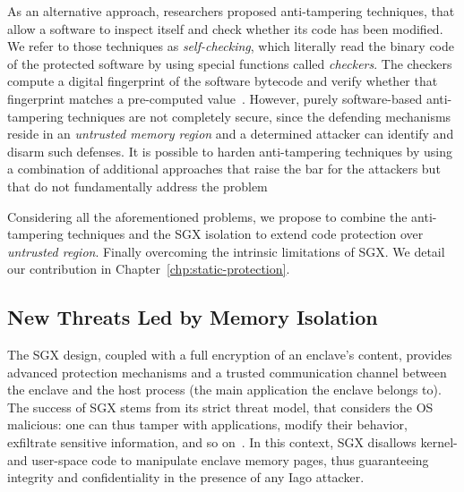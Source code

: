 As an alternative approach, researchers proposed anti-tampering techniques, 
that allow a software to inspect itself and check whether its code has been 
modified.
We refer to those techniques as \emph{self-checking}, which literally read the 
binary code of the protected software by using special functions called 
\emph{checkers}.
The checkers compute a digital fingerprint of the software bytecode and verify 
whether that fingerprint matches a pre-computed 
value~\citep{nagra2009surreptitious}. 
However, purely software-based anti-tampering techniques are not 
completely secure, since the defending mechanisms reside in an 
\emph{untrusted memory region} and a determined attacker can identify and 
disarm such defenses.
It is possible to harden anti-tampering techniques by using a combination of 
additional 
approaches that raise the bar for the attackers but that do not fundamentally 
address the 
problem~~\citep{horne2001dynamic,banescu2017tutorial,chen2016advanced,chang2001protecting,viticchie2016reactive}

Considering all the aforementioned problems, we propose to combine the 
anti-tampering techniques and the SGX isolation to extend code protection over 
\emph{untrusted region}.
Finally overcoming the intrinsic limitations of SGX.
We detail our contribution in Chapter~\ref{chp:static-protection}.

\subsection{New Threats Led by Memory Isolation}
\label{ssec:contribution2}

The SGX design, coupled with a full encryption of an enclave's content, provides
advanced protection mechanisms and a trusted communication channel between the
enclave and the host process (\ie the main application the enclave belongs to).
The success of SGX stems from its strict threat model, that considers the OS
malicious: one can thus tamper with applications, modify their
behavior, exfiltrate sensitive information, and so on~\citep{iagoattack}.
In this context, SGX disallows kernel- and user-space code to
manipulate enclave memory pages, thus guaranteeing integrity and
confidentiality in the presence of any Iago attacker.

